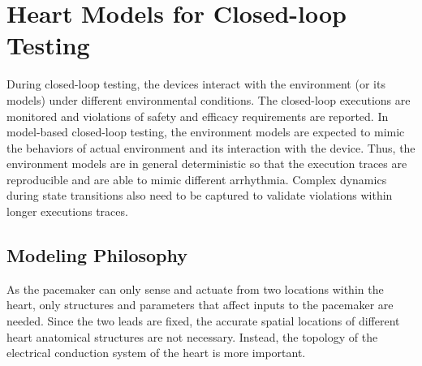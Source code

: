 

\section{Heart Models for Closed-loop Testing}
During closed-loop testing, the devices interact with the environment (or its models) under different environmental conditions. The closed-loop executions are monitored and violations of safety and efficacy requirements are reported. In model-based closed-loop testing, the environment models are expected to mimic the behaviors of actual environment and its interaction with the device. Thus, the environment models are in general deterministic so that the execution traces are reproducible and are able to mimic different arrhythmia. Complex dynamics during state transitions also need to be captured to validate violations within longer executions traces. 

\subsection{Modeling Philosophy}
As the pacemaker can only sense and actuate from two locations within the heart, only structures and parameters that affect inputs to the pacemaker are needed. Since the two leads are fixed, the accurate spatial locations of different heart anatomical structures are not necessary. Instead, the topology of the electrical conduction system of the heart is more important. 


